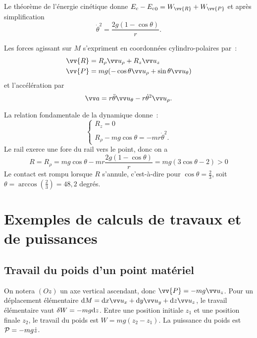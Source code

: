 Le théorème de l'énergie cinétique donne $E_c - {E_c}_{0} = W_{\vv{R}} + W_{\vv{P}}$ et après simplification
\begin{equation}
  \dot{\theta}^2 = \frac{2g(1-\cos\theta)}{r}.
\end{equation}

Les forces agissant sur $M$ s'expriment en coordonnées cylindro-polaires par~:
\begin{align}
  \vv{R} &= R_\rho \urho + R_z \uz \\
  \vv{P} &= mg(-\cos\theta \urho +\sin\theta \utheta)
\end{align}
et l'accélération par
\begin{equation}
  \va = r \ddot{\theta}\utheta -r\dot{\theta}^2\urho.
\end{equation}

La relation fondamentale de la dynamique donne~:
\begin{equation}
  \begin{cases}
    R_z = 0 \\
    R_\rho -mg\cos\theta =-mr\dot{\theta}^2.
  \end{cases}
\end{equation}
Le rail exerce une fore du rail vers le point, donc on a
\begin{equation}
  R=R_\rho = mg\cos\theta - mr \frac{2g(1-\cos\theta)}{r} = mg(3\cos\theta -2)>0
\end{equation}
Le contact est rompu lorsque $R$ s'annule, c'est-à-dire pour $\cos\theta = \frac{2}{3}$, soit $\theta = \arccos\left(\frac{2}{3}\right) = 48,2$ degrés.

\section{Exemples de calculs de travaux et de puissances}
\label{chap-4sec:exemplesdecalculs}

\subsection{Travail du poids d'un point matériel}
\label{chap4-subsec:travaildupoids}

On notera $(Oz)$ un axe vertical ascendant, donc $\vv{P}=-mg\uz$. Pour un déplacement élémentaire $\D M = \D x \ux + \D y \uy + \D z \uz$, le travail élémentaire vaut $\delta W = -mg\D z$. Entre une position initiale $z_1$ et une position finale $z_2$, le travail du poids est $W=mg(z_2-z_1)$. La puissance du poids est $\P=-mg\dot{z}$.

